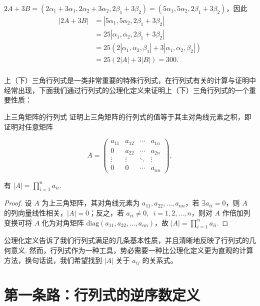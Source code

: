 \begin{solution}
    $2A+3B=(2\alpha_1+3\alpha_1,2\alpha_2+3\alpha_2,2\beta_1+3\beta_2)=(5\alpha_1,5\alpha_2,2\beta_1+3\beta_2)$，因此
    \begin{align*}
        |2A+3B| & =|5\alpha_1,5\alpha_2,2\beta_1+3\beta_2|                       \\
                & =25|\alpha_1,\alpha_2,2\beta_1+3\beta_2|                       \\
                & =25(2|\alpha_1,\alpha_2,\beta_1|+3|\alpha_1,\alpha_2,\beta_2|) \\
                & =25(2|A|+3|B|)=300.                                            \\
    \end{align*}
\end{solution}

上（下）三角行列式是一类非常重要的特殊行列式，在行列式有关的计算与证明中经常出现，下面我们通过行列式的公理化定义来证明上（下）三角行列式的一个重要性质：

\begin{example}{上三角矩阵的行列式}{}
    证明上三角矩阵的行列式的值等于其主对角线元素之积，即证明对任意矩阵

    \[
        A = \begin{pmatrix}
            a_{11} & a_{12} & \cdots & a_{1n} \\
            0      & a_{22} & \cdots & a_{2n} \\
            \vdots & \vdots & \ddots & \vdots \\
            0      & 0      & \cdots & a_{nn}
        \end{pmatrix},
    \]

    有 $|A| = \prod_{i=1}^n a_{ii}$.
\end{example}

\begin{proof}
    设 $A$ 为上三角矩阵，其对角线元素为 $a_{11}, a_{22}, \ldots, a_{nn}$，若 $\exists a_{ii} = 0$，则 $A$ 的列向量线性相关，$|A| = 0$；反之，若 $a_{ii} \neq 0, \enspace i=1,2,\ldots,n$，则对 $A$ 作倍加列变换可将 $A$ 化为对角矩阵 $\mathrm{diag}(a_{11},a_{22},\ldots,a_{nn})$，故 $|A| = \prod_{i=1}^n a_{ii}$.
\end{proof}

公理化定义告诉了我们行列式满足的几条基本性质，并且清晰地反映了行列式的几何意义. 然而，行列式作为一种工具，势必需要一种比公理化定义更为直观的计算方法，换句话说，我们希望找到 $|A|$ 关于 $a_{ij}$ 的关系式。

\section{第一条路：行列式的逆序数定义}


